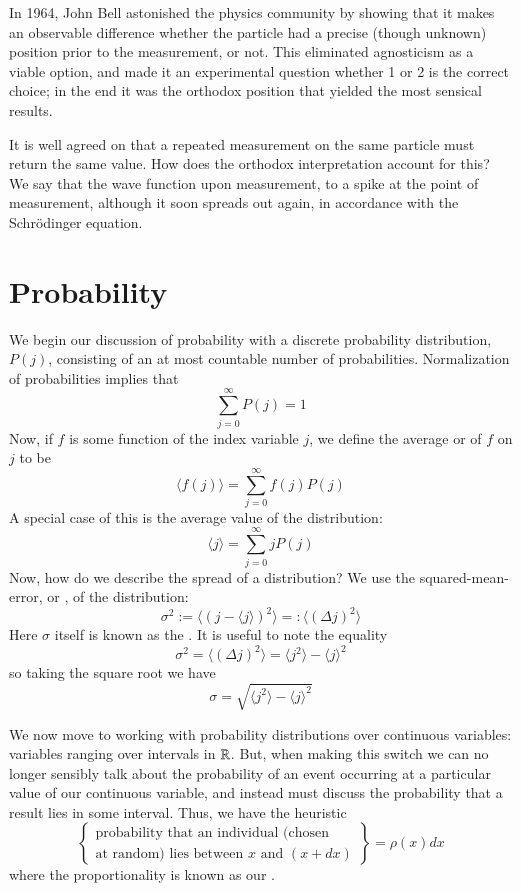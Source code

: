 \documentclass[12pt, a4paper, oneside, openright, titlepage]{book}
\begin{document}
In 1964, John Bell astonished the physics community by showing that it makes an observable difference whether the particle had a precise (though unknown) position prior to the measurement, or not. This eliminated agnosticism as a viable option, and made it an experimental question whether 1 or 2 is the correct choice; in the end it was the orthodox position that yielded the most sensical results. 

It is well agreed on that a repeated measurement on the same particle must return the same value. How does the orthodox interpretation account for this? We say that the wave function  upon measurement, to a spike at the point of measurement, although it soon spreads out again, in accordance with the Schr\"{o}dinger equation.


\section{Probability}

We begin our discussion of probability with a discrete probability distribution, $P(j)$, consisting of an at most countable number of probabilities. Normalization of probabilities implies that $$\sum_{j=0}^{\infty}P(j) = 1$$
Now, if $f$ is some function of the index variable $j$, we define the average or  of $f$ on $j$ to be \begin{equation*}
    \boxed{\langle f(j)\rangle = \sum_{j=0}^{\infty}f(j)P(j)}
\end{equation*}
A special case of this is the average value of the distribution: \begin{equation*}
    \boxed{\langle j\rangle = \sum_{j=0}^{\infty}jP(j)}
\end{equation*}
Now, how do we describe the spread of a distribution? We use the squared-mean-error, or , of the distribution: \begin{equation*}
    \boxed{\sigma^2 := \langle (j-\langle j\rangle)^2\rangle =: \langle (\Delta j)^2\rangle}
\end{equation*}
Here $\sigma$ itself is known as the . It is useful to note the equality $$\sigma^2 = \langle(\Delta j)^2\rangle = \langle j^2\rangle - \langle j\rangle^2$$
so taking the square root we have $$\sigma = \sqrt{\langle j^2\rangle - \langle j \rangle^2}$$


We now move to working with probability distributions over continuous variables: variables ranging over intervals in $\mathbb R$. But, when making this switch we can no longer sensibly talk about the probability of an event occurring at a particular value of our continuous variable, and instead must discuss the probability that a result lies in some interval. Thus, we have the heuristic $$\left\{\begin{array}{c} \text{probability that an individual (chosen }\\ \text{at random) lies between $x$ and $(x+dx)$}\end{array}\right\} = \rho(x)dx$$
where the proportionality is known as our . 
\end{document}
